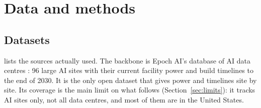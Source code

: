 \section{Data and methods}\label{sec:methods}

\subsection{Datasets}
 lists the sources actually used. The backbone is Epoch AI's database of AI data centres
\citep{epoch2026dc}: 96 large AI sites with their current facility power and build timelines to the end of 2030. It is
the only open dataset that gives power and timelines site by site. Its coverage is the main limit on what follows
(Section~\ref{sec:limits}): it tracks AI sites only, not all data centres, and most of them are in the United States.

